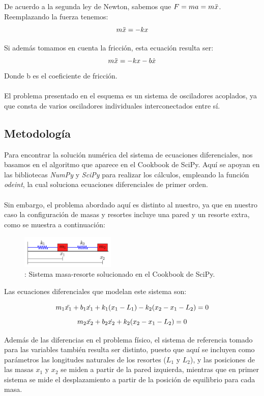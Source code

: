 \documentclass[letterpaper,12pt]{article}
\begin{document}
De acuerdo a la segunda ley de Newton, sabemos que $F=ma=m\Ddot{x}$. Reemplazando la fuerza tenemos:
\[m\Ddot{x}=-kx\]

Si además tomamos en cuenta la fricción, esta ecuación resulta ser:
\[m\Ddot{x}=-kx-b\dot{x}\]
Donde b es el coeficiente de fricción.\\\\

El problema presentado en el esquema es un sistema de osciladores acoplados, ya que consta de varios osciladores individuales interconectados entre sí. 

\subsection{Metodología} 
Para encontrar la solución numérica del sistema de ecuaciones diferenciales, nos basamos en el algoritmo que aparece en el Cookbook de SciPy. Aquí se apoyan en las bibliotecas \emph{NumPy} y \emph{SciPy} para realizar los cálculos, empleando la función \emph{odeint}, la cual soluciona ecuaciones diferenciales de primer orden.\\\\
Sin embargo, el problema abordado aquí es distinto al nuestro, ya que en nuestro caso la configuración de masas y resortes incluye una pared y un resorte extra, como se muestra a continuación:

\begin{figure}[H]
\centering
\includegraphics[width=0.4\textwidth]{esquema2.png}
\caption{\label{fig:graf1}: Sistema masa-resorte solucionado en el Cookbook de SciPy. }
\end{figure}

Las ecuaciones diferenciales que modelan este sistema son:

\begin{equation*}
    m_{1}\Ddot{x_{1}} + b_{1}\Dot{x_{1}} + k_{1}(x_{1} - L_{1}) - k_{2}(x_{2} - x_{1} - L_{2}) = 0 
\end{equation*}
\begin{equation*}
    m_{2}\Ddot{x_{2}} + b_{2}\Dot{x_{2}} + k_{2}(x_{2} - x_{1} - L_{2}) = 0  
\end{equation*} 

Además de las diferencias en el problema físico, el sistema de referencia tomado para las variables también resulta ser distinto, puesto que aquí se incluyen como parámetros las longitudes naturales de los resortes ($L_{1}$ y $L_{2}$), y las posiciones de las masas $x_{1}$ y $x_{2}$ se miden a partir de la pared izquierda, mientras que en primer sistema se mide el desplazamiento a partir de la posición de equilibrio para cada masa.\\\\
\end{document}
